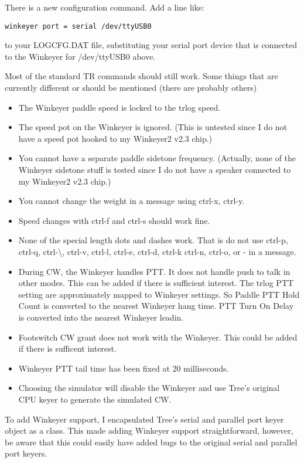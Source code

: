 \documentclass[12pt]{article}
\begin{document}
There is a new configuration
command. Add a line like:
\begin{verbatim}
winkeyer port = serial /dev/ttyUSB0
\end{verbatim}
to your LOGCFG.DAT file,
substituting your serial port device that
is connected to the Winkeyer for /dev/ttyUSB0 above.

Most of the standard TR commands should still work. Some things that
are currently different or should be mentioned (there are probably others)
\begin{itemize}
\item
The Winkeyer paddle speed is locked to the trlog speed.
\item
The speed pot on the Winkeyer is ignored. (This is untested since I
do not have a speed pot hooked to my Winkeyer2 v2.3 chip.)
\item
You cannot have a separate paddle sidetone frequency. (Actually, none
of the Winkeyer sidetone stuff is tested since I do not have a speaker
connected to my Winkeyer2 v2.3 chip.)
\item
You cannot change the weight in a message using ctrl-x, ctrl-y.
\item
Speed changes with ctrl-f and ctrl-s should work fine.
\item
None of the special length dots and dashes work. That is do not
use ctrl-p, ctrl-q, ctrl-\textbackslash, ctrl-v, ctrl-l, ctrl-e, ctrl-d, ctrl-k
ctrl-n, ctrl-o, or - in a message.
\item
During CW, the Winkeyer handles PTT. It does not handle push to talk
in other modes. This can be added if there is sufficient interest.
The trlog PTT setting are approximately mapped to Winkeyer settings.
So Paddle PTT Hold Count is converted to the nearest Winkeyer hang time.
PTT Turn On Delay is converted into the nearest Winkeyer leadin.
\item
Footswitch CW grant does not work with the Winkeyer. This could be
added if there is sufficent interest.
\item
Winkeyer PTT tail time has been fixed at 20 milliseconds.
\item
Choosing the simulator will disable the Winkeyer and use Tree's original
CPU keyer to generate the simulated CW.
\end{itemize}

To add Winkeyer support, I encapsulated Tree's serial and parallel
port keyer object as a class.  This made adding Winkeyer support
straightforward, however, be aware that this could easily have added
bugs to the original serial and parallel port keyers.
\end{document}
